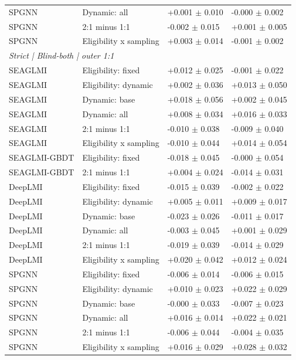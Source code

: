 {\begin{longtable}{llll}
SPGNN & Dynamic: all & +0.001 $\pm$ 0.010 & -0.000 $\pm$ 0.002 \\
SPGNN & 2:1 minus 1:1 & -0.002 $\pm$ 0.015 & +0.001 $\pm$ 0.005 \\
SPGNN & Eligibility x sampling & +0.003 $\pm$ 0.014 & -0.001 $\pm$ 0.002 \\
\multicolumn{4}{l}{\textit{Strict | Blind-both | outer 1:1}}\\
SEAGLMI & Eligibility: fixed & +0.012 $\pm$ 0.025 & -0.001 $\pm$ 0.022 \\
SEAGLMI & Eligibility: dynamic & +0.002 $\pm$ 0.036 & +0.013 $\pm$ 0.050 \\
SEAGLMI & Dynamic: base & +0.018 $\pm$ 0.056 & +0.002 $\pm$ 0.045 \\
SEAGLMI & Dynamic: all & +0.008 $\pm$ 0.034 & +0.016 $\pm$ 0.033 \\
SEAGLMI & 2:1 minus 1:1 & -0.010 $\pm$ 0.038 & -0.009 $\pm$ 0.040 \\
SEAGLMI & Eligibility x sampling & -0.010 $\pm$ 0.044 & +0.014 $\pm$ 0.054 \\
SEAGLMI-GBDT & Eligibility: fixed & -0.018 $\pm$ 0.045 & -0.000 $\pm$ 0.054 \\
SEAGLMI-GBDT & 2:1 minus 1:1 & +0.004 $\pm$ 0.024 & -0.014 $\pm$ 0.031 \\
DeepLMI & Eligibility: fixed & -0.015 $\pm$ 0.039 & -0.002 $\pm$ 0.022 \\
DeepLMI & Eligibility: dynamic & +0.005 $\pm$ 0.011 & +0.009 $\pm$ 0.017 \\
DeepLMI & Dynamic: base & -0.023 $\pm$ 0.026 & -0.011 $\pm$ 0.017 \\
DeepLMI & Dynamic: all & -0.003 $\pm$ 0.045 & +0.001 $\pm$ 0.029 \\
DeepLMI & 2:1 minus 1:1 & -0.019 $\pm$ 0.039 & -0.014 $\pm$ 0.029 \\
DeepLMI & Eligibility x sampling & +0.020 $\pm$ 0.042 & +0.012 $\pm$ 0.024 \\
SPGNN & Eligibility: fixed & -0.006 $\pm$ 0.014 & -0.006 $\pm$ 0.015 \\
SPGNN & Eligibility: dynamic & +0.010 $\pm$ 0.023 & +0.022 $\pm$ 0.029 \\
SPGNN & Dynamic: base & -0.000 $\pm$ 0.033 & -0.007 $\pm$ 0.023 \\
SPGNN & Dynamic: all & +0.016 $\pm$ 0.014 & +0.022 $\pm$ 0.021 \\
SPGNN & 2:1 minus 1:1 & -0.006 $\pm$ 0.044 & -0.004 $\pm$ 0.035 \\
SPGNN & Eligibility x sampling & +0.016 $\pm$ 0.029 & +0.028 $\pm$ 0.032 \\

\end{longtable}}

